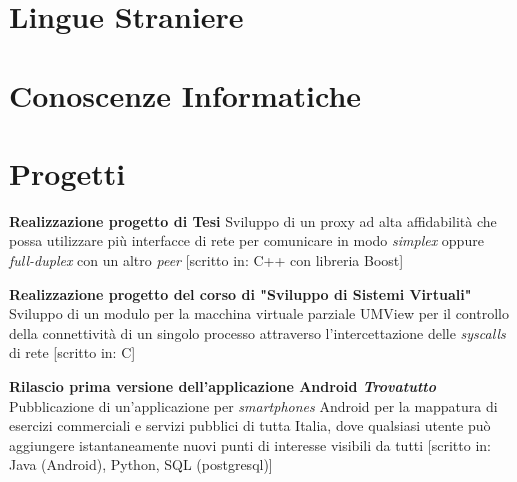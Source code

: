 \documentclass[11pt,a4paper]{moderncv}
\begin{document}
\section{Lingue Straniere}

\section{Conoscenze Informatiche}


\section{Progetti}
 {\textbf{Realizzazione progetto di Tesi} \cite{progettotesi}\newline Sviluppo di un proxy ad alta affidabilità che possa utilizzare più interfacce di rete per comunicare in modo {\em simplex} oppure {\em full-duplex} con un altro {\em peer} [scritto in: C++ con libreria Boost]}

 {\textbf{Realizzazione progetto del corso di "Sviluppo di Sistemi Virtuali"} \cite{vsd}\newline Sviluppo di un modulo per la macchina virtuale parziale UMView per il controllo della connettività di un singolo processo attraverso l'intercettazione delle {\em syscalls} di rete [scritto in: C]}

 {\textbf{Rilascio prima versione dell'applicazione Android {\em Trovatutto}} \cite{trovatutto} \newline Pubblicazione di un'applicazione per {\em smartphones} Android per la mappatura di esercizi commerciali e servizi pubblici di tutta Italia, dove qualsiasi utente può aggiungere istantaneamente nuovi punti di interesse visibili da tutti [scritto in: Java (Android), Python, SQL (postgresql)]}
\end{document}
